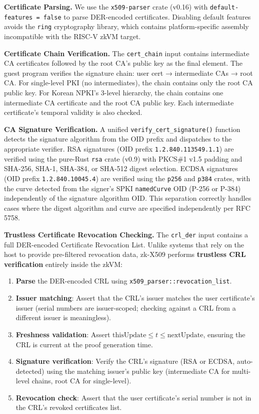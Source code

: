 \documentclass[11pt, a4paper]{article}
\providecommand{\tightlist}{%
  \setlength{\itemsep}{0pt}\setlength{\parskip}{0pt}}
\begin{document}
\textbf{Certificate Parsing.} We use the \texttt{x509-parser} crate
(v0.16) with \texttt{default-features\ =\ false} to parse DER-encoded
certificates. Disabling default features avoids the \texttt{ring}
cryptography library, which contains platform-specific assembly
incompatible with the RISC-V zkVM target.

\textbf{Certificate Chain Verification.} The \texttt{cert\_chain} input
contains intermediate CA certificates followed by the root CA's public
key as the final element. The guest program verifies the signature
chain: user cert → intermediate CAs → root CA. For single-level PKI (no
intermediates), the chain contains only the root CA public key. For
Korean NPKI's 3-level hierarchy, the chain contains one intermediate CA
certificate and the root CA public key. Each intermediate certificate's
temporal validity is also checked.

\textbf{CA Signature Verification.} A unified
\texttt{verify\_cert\_signature()} function detects the signature
algorithm from the OID prefix and dispatches to the appropriate
verifier. RSA signatures (OID prefix \texttt{1.2.840.113549.1.1}) are
verified using the pure-Rust \texttt{rsa} crate (v0.9) with PKCS\#1 v1.5
padding and SHA-256, SHA-1, SHA-384, or SHA-512 digest selection. ECDSA
signatures (OID prefix \texttt{1.2.840.10045.4}) are verified using the
\texttt{p256} and \texttt{p384} crates, with the curve detected from the
signer's SPKI \texttt{namedCurve} OID (P-256 or P-384) independently of
the signature algorithm OID. This separation correctly handles cases
where the digest algorithm and curve are specified independently per RFC
5758.

\textbf{Trustless Certificate Revocation Checking.} The
\texttt{crl\_der} input contains a full DER-encoded Certificate
Revocation List. Unlike systems that rely on the host to provide
pre-filtered revocation data, zk-X509 performs \textbf{trustless CRL
verification} entirely inside the zkVM:

\begin{enumerate}
\def\labelenumi{\arabic{enumi}.}
\tightlist
\item
  \textbf{Parse} the DER-encoded CRL using
  \texttt{x509\_parser::revocation\_list}.
\item
  \textbf{Issuer matching}: Assert that the CRL's issuer matches the
  user certificate's issuer (serial numbers are issuer-scoped; checking
  against a CRL from a different issuer is meaningless).
\item
  \textbf{Freshness validation}: Assert
  \(\text{thisUpdate} \leq t \leq \text{nextUpdate}\), ensuring the CRL
  is current at the proof generation time.
\item
  \textbf{Signature verification}: Verify the CRL's signature (RSA or
  ECDSA, auto-detected) using the matching issuer's public key
  (intermediate CA for multi-level chains, root CA for single-level).
\item
  \textbf{Revocation check}: Assert that the user certificate's serial
  number is not in the CRL's revoked certificates list.
\end{enumerate}
\end{document}
